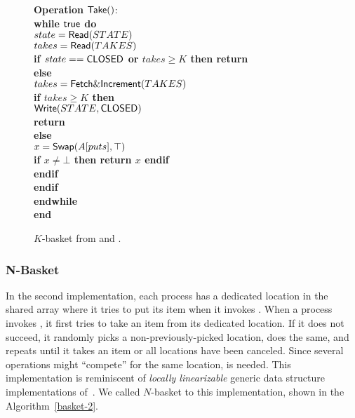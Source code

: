 \begin{figure}[ht!]
{{\begin{minipage}[t]{180mm}
\begin{tabbing}
{\bf Operation} ${\sf Take}()$: \\
 \> {\bf while \({\sf true}\) do}\\
 \> \> \(state = {\sf Read}(STATE)\) \\
 \> \> \(takes = {\sf Read}(TAKES)\) \\
 \> \> {\bf if \(state == {\sf CLOSED}\) or \(takes \geq K\) then return \closed} \\
 \> \> {\bf else} \\
 \> \> \> \(takes = {\sf Fetch\&Increment}(TAKES)\) \\
 \> \> \> {\bf if \(takes \geq K\) then} \\
 \> \> \> \> \({\sf Write}(STATE, {\sf CLOSED})\) \\
 \> \> \> \> \textbf{return} \closed \\
 \> \> \> {\bf else} \\
 \> \> \> \> \(x = {\sf Swap}(A[puts], \top)\) \\
 \> \> \> \> {\bf if \(x \neq \bot\) then return \(x\) endif} \\
 \> \> \> {\bf endif} \\
 \> \> {\bf endif} \\
 \> {\bf endwhile}\\
{\bf end \Take}
\end{tabbing}
\end{minipage}}
\caption{\label{basket-1}$K$-basket from \FAI and \SWAP.}
}
\end{figure}

\subsubsection{N-Basket}

In the second implementation, each process has a dedicated location in the shared array where it tries to put its item when it invokes \Put. When a process invokes \Take, it first tries to take an item from its dedicated location. If it does not succeed, it randomly picks a non-previously-picked location, does the same, and repeats until it takes an item or all locations have been canceled. Since several operations might ``compete'' for the same location, \CAS is needed. This implementation is reminiscent of \emph{locally linearizable} generic data structure implementations of~\cite{DBLP_conf_concur_HaasHHKLPSSV16}. We called \(N\)-basket to this implementation, shown in the Algorithm~\ref{basket-2}.

